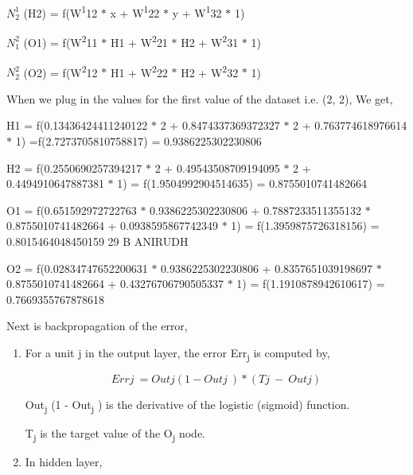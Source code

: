 \documentclass[12pt]{article}
\renewcommand{\_}{\kern-1.5pt\textunderscore\kern-1.5pt}
\begin{document}
 \( N_{2}^{1} \)  (H2) = f(W\textsuperscript{1}12 $\ast$  x + W\textsuperscript{1}22 $\ast$  y + W\textsuperscript{1}32 $\ast$  1) \par

 \( N_{1}^{2} \)  (O1) = f(W\textsuperscript{2}11 $\ast$  H1 + W\textsuperscript{2}21 $\ast$  H2 + W\textsuperscript{2}31 $\ast$  1) \par

 \( N_{2}^{2} \)  (O2) = f(W\textsuperscript{2}12 $\ast$  H1 + W\textsuperscript{2}22 $\ast$  H2 + W\textsuperscript{2}32 $\ast$  1) \par

When we plug in the values for the first value of the dataset i.e. (2, 2), We get, \par

H1 = f(0.13436424411240122 $\ast$  2 + 0.8474337369372327 $\ast$  2 + 0.763774618976614 $\ast$  1) =f(2.7273705810758817) = 0.9386225302230806 \par

H2 = f(0.2550690257394217 $\ast$  2 + 0.49543508709194095 $\ast$  2 + 0.4494910647887381 $\ast$  1) = f(1.9504992904514635) = 0.8755010741482664 \par

O1 = f(0.651592972722763 $\ast$  0.9386225302230806 + 0.7887233511355132 $\ast$  0.8755010741482664 + 0.0938595867742349 $\ast$  1) = f(1.3959875726318156) = 0.8015464048450159 29 B ANIRUDH \par

O2 = f(0.02834747652200631 $\ast$  0.9386225302230806 + 0.8357651039198697 $\ast$  0.8755010741482664 + 0.43276706790505337 $\ast$  1) = f(1.1910878942610617) = 0.7669355767878618\par

Next is backpropagation of the error,\par

\begin{enumerate}
	\item For a unit j in the output layer, the error Err\textsubscript{j} is computed by, \par

 \[ Errj~= Outj  \left( 1 - Outj~ \right)  \ast  \left( Tj~-~Outj  \right)  \] \par

Out\textsubscript{j} (1 - Out\textsubscript{j} ) is the derivative of the logistic (sigmoid) function. \par

T\textsubscript{j }is the target value of the O\textsubscript{j} node.\par

	\item In hidden layer,
\end{enumerate}\par
\end{document}
